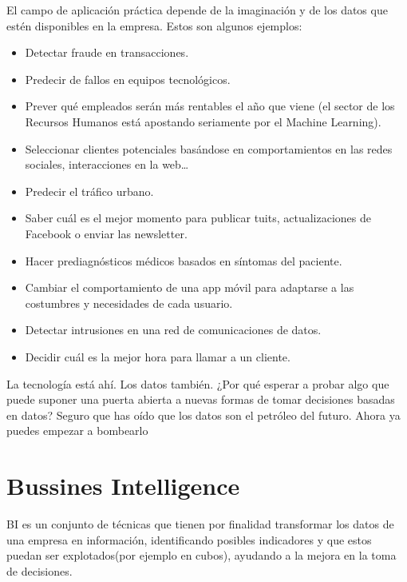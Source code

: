 \documentclass[preprint,12pt]{elsarticle}
\begin{document}
\begin{enumerate}[A)]
			
			El campo de aplicación práctica depende de la imaginación y de los datos que estén disponibles en la empresa. Estos son algunos ejemplos:
			\begin{itemize}
				\item Detectar fraude en transacciones.
				\item Predecir de fallos en equipos tecnológicos.
				\item Prever qué empleados serán más rentables el año que viene (el sector de los Recursos Humanos está apostando seriamente por el Machine Learning).
				\item Seleccionar clientes potenciales basándose en comportamientos en las redes sociales, interacciones en la web…
				\item Predecir el tráfico urbano.
				\item Saber cuál es el mejor momento para publicar tuits, actualizaciones de Facebook o enviar las newsletter.
				\item Hacer prediagnósticos médicos basados en síntomas del paciente.
				\item Cambiar el comportamiento de una app móvil para adaptarse a las costumbres y necesidades de cada usuario.
				\item Detectar intrusiones en una red de comunicaciones de datos.
				\item Decidir cuál es la mejor hora para llamar a un cliente.
				
			\end{itemize}
		
			La tecnología está ahí. Los datos también. ¿Por qué esperar a probar algo que puede suponer una puerta abierta a nuevas formas de tomar decisiones basadas en datos? Seguro que has oído que los datos son el petróleo del futuro. Ahora ya puedes empezar a bombearlo
							
		\end{enumerate}
	
	\newpage
	
	\section{Bussines Intelligence}
	\label{S:2}
	
	BI es un conjunto de técnicas que tienen por finalidad transformar los datos de una empresa en información, identificando posibles indicadores y que estos puedan ser explotados(por ejemplo en cubos), ayudando a la mejora en la toma de decisiones.\\
	
\end{document}
